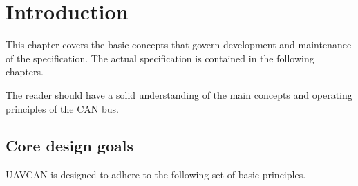 \chapter{Introduction}

This chapter covers the basic concepts that govern development and maintenance of the specification.
The actual specification is contained in the following chapters.

The reader should have a solid understanding of the main concepts and operating principles of the CAN bus.

\section{Core design goals}

UAVCAN is designed to adhere to the following set of basic principles.

